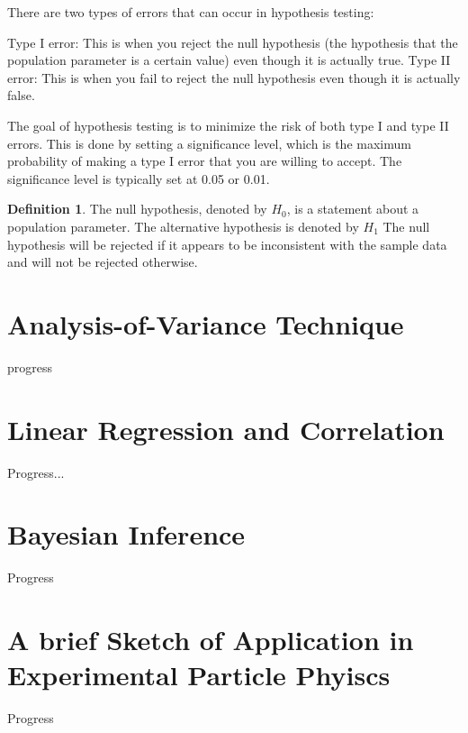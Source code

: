 \documentclass[12pt,a4paper]{article}
\theoremstyle{example}
\theoremstyle{definition}
\newtheorem{definition}{Definition}
\theoremstyle{theorem}
\begin{document}
There are two types of errors that can occur in hypothesis testing:

    Type I error: This is when you reject the null hypothesis (the hypothesis that the population parameter is a certain value) even though it is actually true.
    Type II error: This is when you fail to reject the null hypothesis even though it is actually false.

The goal of hypothesis testing is to minimize the risk of both type I and type II errors. This is done by setting a significance level, which is the maximum probability of making a type I error that you are willing to accept. The significance level is typically set at 0.05 or 0.01.
\begin{definition}
    The null hypothesis, denoted by $H_0$, is a statement about a population parameter. The alternative
hypothesis is denoted by $H_1$ The null hypothesis will be rejected if it appears to be inconsistent
with the sample data and will not be rejected otherwise.
\end{definition}
\section{Analysis-of-Variance Technique}
progress
\section{ Linear Regression and Correlation}
Progress...
\section{Bayesian Inference}
Progress


\section{A brief Sketch of Application in Experimental Particle Phyiscs}
Progress


\end{document}
